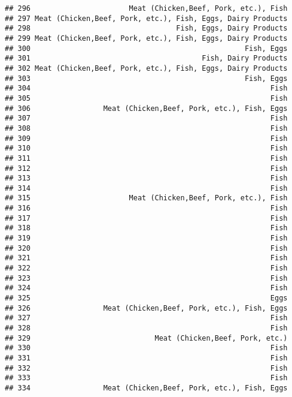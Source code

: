 \documentclass[
]{article}
\begin{document}
\begin{verbatim}
## 296                       Meat (Chicken,Beef, Pork, etc.), Fish
## 297 Meat (Chicken,Beef, Pork, etc.), Fish, Eggs, Dairy Products
## 298                                  Fish, Eggs, Dairy Products
## 299 Meat (Chicken,Beef, Pork, etc.), Fish, Eggs, Dairy Products
## 300                                                  Fish, Eggs
## 301                                        Fish, Dairy Products
## 302 Meat (Chicken,Beef, Pork, etc.), Fish, Eggs, Dairy Products
## 303                                                  Fish, Eggs
## 304                                                        Fish
## 305                                                        Fish
## 306                 Meat (Chicken,Beef, Pork, etc.), Fish, Eggs
## 307                                                        Fish
## 308                                                        Fish
## 309                                                        Fish
## 310                                                        Fish
## 311                                                        Fish
## 312                                                        Fish
## 313                                                        Fish
## 314                                                        Fish
## 315                       Meat (Chicken,Beef, Pork, etc.), Fish
## 316                                                        Fish
## 317                                                        Fish
## 318                                                        Fish
## 319                                                        Fish
## 320                                                        Fish
## 321                                                        Fish
## 322                                                        Fish
## 323                                                        Fish
## 324                                                        Fish
## 325                                                        Eggs
## 326                 Meat (Chicken,Beef, Pork, etc.), Fish, Eggs
## 327                                                        Fish
## 328                                                        Fish
## 329                             Meat (Chicken,Beef, Pork, etc.)
## 330                                                        Fish
## 331                                                        Fish
## 332                                                        Fish
## 333                                                        Fish
## 334                 Meat (Chicken,Beef, Pork, etc.), Fish, Eggs

\end{verbatim}
\end{document}
